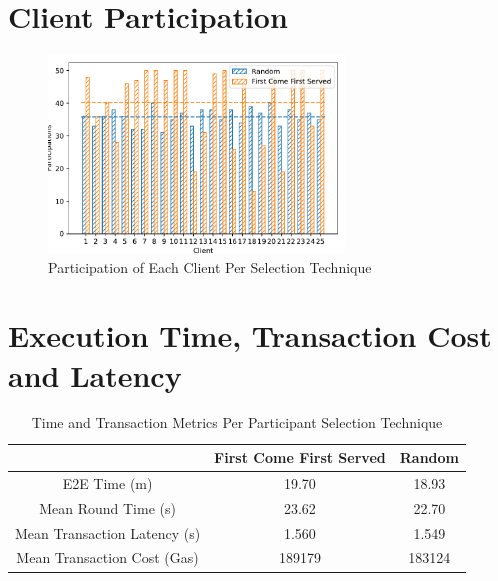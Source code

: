 
\section{Client Participation}

\begin{figure}[!ht]
    \centering
    \centering
    \includegraphics[width=0.7\textwidth]{graphics/02_selection_clients.pdf}
    \caption{Participation of Each Client Per Selection Technique}
    \label{fig:participations_client}
\end{figure}

\section{Execution Time, Transaction Cost and Latency}

\begin{table}[!ht]
\begin{tabular}{c|c|c} \hline \hline
                              & First Come First Served & Random \\ \hline \hline
E2E Time (m)                   & 19.70                   & 18.93  \\ \hline
Mean Round Time (s)            & 23.62                   & 22.70  \\ \hline
Mean Transaction Latency (s)   & 1.560                   & 1.549  \\ \hline
Mean Transaction Cost (Gas)    & 189179                  & 183124 \\ \hline
\end{tabular}
\caption{Time and Transaction Metrics Per Participant Selection Technique}
\label{tab:metrics_selection}
\end{table}

